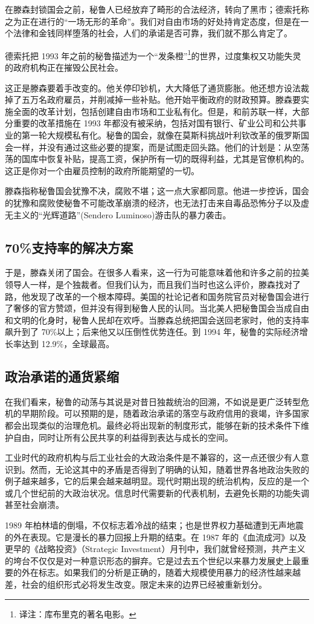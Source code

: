 在滕森封锁国会之前，秘鲁人已经放弃了畸形的合法经济，转向了黑市；德索托称之为正在进行的“一场无形的革命”。我们对自由市场的好处持肯定态度，但是在一个法律和金钱同样堕落的社会，人们的承诺是否可靠，我们就不那么肯定了。

德索托把 1993 年之前的秘鲁描述为一个“发条橙”\footnote{译注：库布里克的著名电影。}的世界，过度集权又功能失灵的政府机构正在摧毁公民社会。

这正是滕森要着手改变的。他关停印钞机，大大降低了通货膨胀。他还想方设法裁掉了五万名政府雇员，并削减掉一些补贴。他开始平衡政府的财政预算。滕森要实施全面的改革计划，包括创建自由市场和工业私有化。但是，和前苏联一样，大部分重要的改革措施在 1993 年都没有被采纳，包括对国有银行、矿业公司和公共事业的第一轮大规模私有化。秘鲁的国会，就像在莫斯科挑战叶利钦改革的俄罗斯国会一样，并没有通过这些必要的提案，而是试图走回头路。他们的计划是：从空荡荡的国库中恢复补贴，提高工资，保护所有一切的既得利益，尤其是官僚机构的。这正是你对一个由雇员控制的政府所能期望的一切。

滕森指称秘鲁国会犹豫不决，腐败不堪；这一点大家都同意。他进一步控诉，国会的犹豫和腐败使秘鲁不可能改革崩溃的经济，也无法打击来自毒品恐怖分子以及虚无主义的“光辉道路”(Sendero Luminoso)游击队的暴力袭击。

\subsection{70\%支持率的解决方案}
于是，滕森关闭了国会。在很多人看来，这一行为可能意味着他和许多之前的拉美领导人一样，是个独裁者。但我们认为，而且我们当时也这么评价，滕森找对了路，他发现了改革的一个根本障碍。美国的社论记者和国务院官员对秘鲁国会进行了奢侈的官方赞颂，但并没有得到秘鲁人民的认同。当北美人把秘鲁国会当成自由和文明的化身时，秘鲁人民却在欢呼。当滕森总统把国会送回老家时，他的支持率飙升到了 70\%以上；后来他又以压倒性优势连任。到 1994 年，秘鲁的实际经济增长率达到 12.9\%，全球最高。

\subsection{政治承诺的通货紧缩}
在我们看来，秘鲁的动荡与其说是对昔日独裁统治的回溯，不如说是更广泛转型危机的早期阶段。可以预期的是，随着政治承诺的落空与政府信用的衰竭，许多国家都会出现类似的治理危机。最终必将出现新的制度形式，能够在新的技术条件下维护自由，同时让所有公民共享的利益得到表达与成长的空间。

工业时代的政府机构与后工业社会的大政治条件是不兼容的，这一点还很少有人意识到。然而，无论这其中的矛盾是否得到了明确的认知，随着世界各地政治失败的例子越来越多，它的后果会越来越明显。现代时期出现的统治机构，反应的是一个或几个世纪前的大政治状况。信息时代需要新的代表机制，去避免长期的功能失调甚至社会崩溃。

1989 年柏林墙的倒塌，不仅标志着冷战的结束；也是世界权力基础遭到无声地震的外在表现。它是漫长的暴力回报上升期的结束。在 1987 年的《血流成河》以及更早的《战略投资》（Strategic Investment）月刊中，我们就曾经预测，共产主义的垮台不仅仅是对一种意识形态的摒弃。它是过去五个世纪以来暴力发展史上最重要的外在标志。如果我们的分析是正确的，随着大规模使用暴力的经济性越来越差，社会的组织形式必将发生改变。限定未来的边界已经被重新划分。